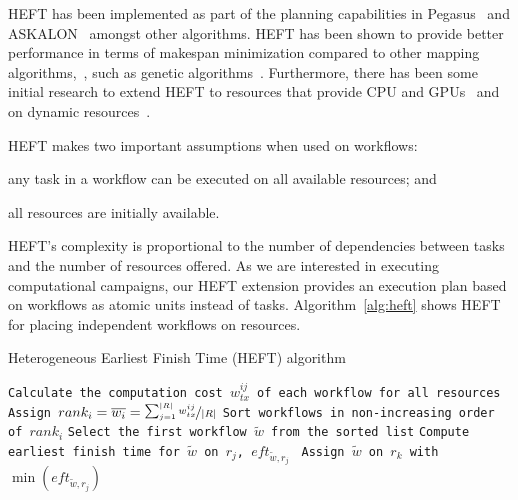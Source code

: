 HEFT has been implemented as part of the planning capabilities in Pegasus~\cite{deelman2015pegasus} and ASKALON~\cite{fahringer2005askalon} amongst other algorithms.
HEFT has been shown to provide better performance in terms of makespan minimization compared to other mapping algorithms,~\cite{topcuoglu2002performance,canon2008comparative}, such as genetic algorithms~\cite{fahringer2005askalon}. 
Furthermore, there has been some initial research to extend HEFT to resources that provide CPU and GPUs~\cite{shetti2013optimization} and on dynamic resources~\cite{dong2007pfas}. 

HEFT makes two important assumptions when used on workflows: 
\begin{inparaenum}[(1)] 
    \item any task in a workflow can be executed on all available resources; and 
    \item all resources are initially available.
\end{inparaenum}
HEFT's complexity is proportional to the number of dependencies between tasks and the number of resources offered. 
As we are interested in executing computational campaigns, our HEFT extension provides an execution plan based on workflows as atomic units instead of tasks.
Algorithm~\ref{alg:heft} shows HEFT for placing independent workflows on resources.

\begin{algorithm}[ht]
    \caption{Heterogeneous Earliest Finish Time (HEFT) algorithm}
    \label{alg:heft}
    \begin{algorithmic}[1]
        \State \texttt{Calculate the computation cost $w_{tx}^{ij}$ of each workflow for all resources}
        \State \texttt{Assign $rank_i = \overline{w_{i}} = \nicefrac{\sum_{j=1}^{|R|}w_{tx}^{ij}}{|R|}$}
        \State \texttt{Sort workflows in non-increasing order of $rank_i$}
        \State \texttt{Select the first workflow $\tilde{w}$ from the sorted list}
        \State\texttt{Compute earliest finish time for $\tilde{w}$ on $r_{j}$, $eft_{\tilde{w},r_j}$ }
        \EndFor
        \State \texttt{Assign  $\tilde{w}$ on $r_k$ with $\min{(eft_{\tilde{w},r_j})}$}
        \EndWhile
        \EndProcedure
    \end{algorithmic}
\end{algorithm}

